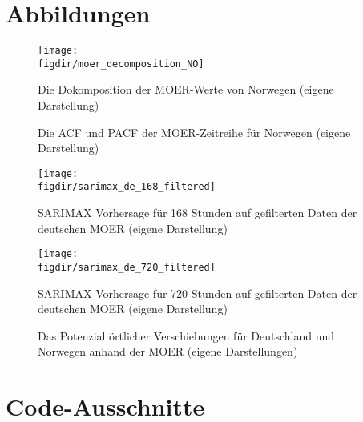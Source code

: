\chapter{Abbildungen}\label{CAP:append-figures}
\begin{figure}
    \caption{Die Dokomposition der MOER-Werte von Norwegen (eigene Darstellung)}
    {\texttt{[image: \\figdir/moer\_decomposition\_NO]}}
    \label{FIG:moer_decomposition_NO}
\end{figure}

\begin{figure}
    \centering
    \qquad
    \caption{Die ACF und PACF der MOER-Zeitreihe für Norwegen (eigene Darstellung)}%
    \label{FIG:acf_pacf_moer_no}%
\end{figure}

\begin{figure}
    \caption{SARIMAX Vorhersage für 168 Stunden auf gefilterten Daten der deutschen MOER (eigene Darstellung)}
    {\texttt{[image: \\figdir/sarimax\_de\_168\_filtered]}}
    \label{FIG:sarimax_de_168_filtered}
\end{figure}
\begin{figure}
    \caption{SARIMAX Vorhersage für 720 Stunden auf gefilterten Daten der deutschen MOER (eigene Darstellung)}
    {\texttt{[image: \\figdir/sarimax\_de\_720\_filtered]}}
    \label{FIG:sarimax_de_720_filtered}
\end{figure}

\begin{figure}
    \centering
    \qquad
    \qquad
    \caption{Das Potenzial örtlicher Verschiebungen für Deutschland und Norwegen anhand der MOER (eigene Darstellungen)}%
    \label{FIG:location-shifting-potential}%
\end{figure}



\chapter{Code-Ausschnitte}

